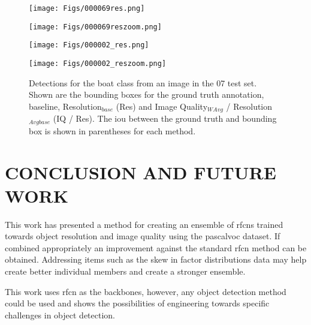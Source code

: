\documentclass[a4paper,twoside]{article}
\begin{document}
\begin{figure*}[!h]
  \texttt{[image: Figs/000069res.png]}
  \caption*{}\label{fig:}
\endminipage\hfill
{}
  \texttt{[image: Figs/000069reszoom.png]}
  \caption*{}\label{fig:}
\endminipage\hfill
{}
  \texttt{[image: Figs/000002\_res.png]}
  \caption*{}\label{fig:}
\endminipage\hfill
{}
  \texttt{[image: Figs/000002\_reszoom.png]}
  \caption*{}\label{fig:}
\endminipage\hfill
\caption{Detections for the boat class from an image in the 07 test set. Shown are the bounding boxes for the ground truth annotation, baseline, Resolution$_{base}$ (Res) and Image Quality$_{WAvg}$ / Resolution$_{Avgbase}$ (IQ / Res). The \gls{iou} between the ground truth and bounding box is shown in parentheses for each method.}
\label{fig:boatres}
\end{figure*}

\begin{comment}
    \begin{figure}[!h]
\minipage{0.2\textwidth}
  \texttt{[image: Figs/000002\_res.png]}
  \caption*{}\label{fig:}
\endminipage\hfill
\minipage{0.2\textwidth}
  \texttt{[image: Figs/000002\_reszoom.png]}
  \caption*{}\label{fig:}
\endminipage\hfill
\caption{Detections for the train class from an image in the 2007 test set. Shown are the bounding boxes for the ground truth annotation, baseline, Resolution$_{base}$ (Res) and Image Quality$_{WAvg}$ / Resolution$_{Avgbase}$ (IQ / Res). The \gls{iou} between the ground truth and bounding box is shown in parentheses for each method.}
\label{fig:trainres}
\end{figure}

\end{comment}
 
\section{\uppercase{Conclusion and Future Work}}
This work has presented a method for creating an ensemble of \glspl{rfcn} trained towards object resolution and image quality using the \gls{pascalvoc} dataset. If combined appropriately an improvement against the standard \gls{rfcn} method can be obtained. Addressing items such as the skew in factor distributions data may help create better individual members and create a stronger ensemble. 

This work uses \gls{rfcn} as the backbones, however, any object detection method could be used and shows the possibilities of engineering towards specific challenges in object detection.


{\small
}


\vfill
\end{document}
